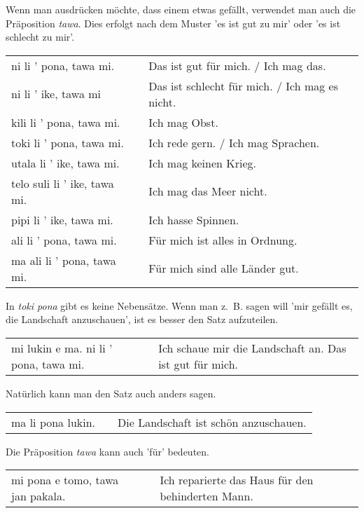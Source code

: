 %
Wenn man ausdrücken möchte, dass einem etwas gefällt, verwendet man auch die Präposition \textit{tawa}.
Dies erfolgt nach dem Muster 'es ist gut zu mir' oder 'es ist schlecht zu mir'.

\begin{supertabular}{p{5,5cm}|ll}
ni li ' pona, tawa mi. && Das ist gut für mich. / Ich mag das. \\
ni li ' ike, tawa mi && Das ist schlecht für mich. / Ich mag es nicht. \\
kili li ' pona, tawa mi. && Ich mag Obst. \\
toki li ' pona, tawa mi. && Ich rede gern. / Ich mag Sprachen. \\
utala li ' ike, tawa mi. && Ich mag keinen Krieg. \\
telo suli li ' ike, tawa mi. && Ich mag das Meer nicht. \\
pipi li ' ike, tawa mi. && Ich hasse Spinnen. \\
ali li ' pona, tawa mi. && Für mich ist alles in Ordnung. \\
ma ali li ' pona, tawa mi. && Für mich sind alle Länder gut. \\
\end{supertabular} 

%
In \textit{toki pona} gibt es keine Nebensätze. 
Wenn man z.~B. sagen will 'mir gefällt es, die Landschaft anzuschauen', ist es besser den Satz aufzuteilen.

\begin{supertabular}{p{5,5cm}|ll}
mi lukin e ma. ni li ' pona, tawa mi. && Ich schaue mir die Landschaft an. Das ist gut für mich. \\
\end{supertabular} 

Natürlich kann man den Satz auch anders sagen.

\begin{supertabular}{p{5,5cm}|ll}
ma li pona lukin. && Die Landschaft ist schön anzuschauen. \\
\end{supertabular} 

%
Die Präposition \textit{tawa} kann auch 'für' bedeuten. 

\begin{supertabular}{p{5,5cm}|ll}
mi pona e tomo, tawa jan pakala. && Ich reparierte das Haus für den behinderten Mann. \\
\end{supertabular} 

